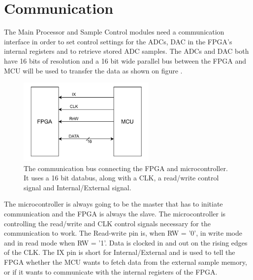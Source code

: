 \section{Communication} \label{subsec:Communication}
The Main Processor and Sample Control modules need a communication interface in order to set control settings for the ADCs, DAC in the FPGA's internal registers and to retrieve stored ADC samples. The ADCs and DAC both have 16 bits of resolution and a 16 bit wide parallel bus between the FPGA and MCU will be used to transfer the data as shown on figure .

\begin{figure}[H]
    \centering
    \includegraphics[clip, trim=0 0 0 0, width=0.6\textwidth]{Sections/7_SystemDesign/Figures/CommPort_Block.pdf}
    \caption{The communication bus connecting the FPGA and microcontroller. It uses a 16 bit databus, along with a CLK, a read/write control signal and Internal/External signal.}
    \label{fig_7_2_1_CommBus}
\end{figure}

The microcontroller is always going to be the master that has to initiate communication and the FPGA is always the slave. The microcontroller is controlling the read/write and CLK control signals necessary for the communication to work. The Read-write pin is, when  RW = '0', in write mode and in read mode when RW = '1'. Data is clocked in and out on the rising edges of the CLK. The IX pin is short for Internal/External and is used to tell the FPGA whether the MCU wants to fetch data from the external sample memory, or if it wants to communicate with the internal registers of the FPGA. 


